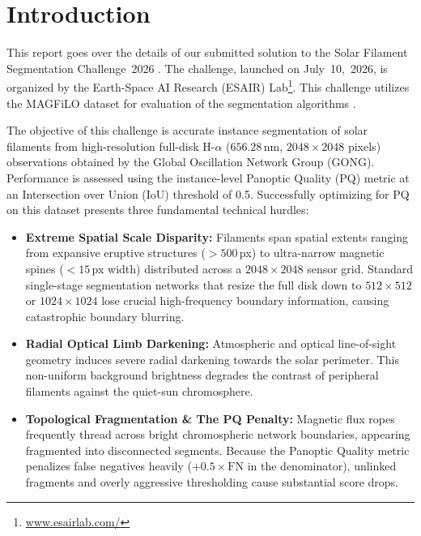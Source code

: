 \documentclass[sigconf]{acmart}
\begin{document}
\maketitle

\ifguideStyle
{}
\par\medskip
\fi

\section{Introduction}
    This report goes over the details of our submitted solution to the Solar Filament Segmentation Challenge~2026 \cite{filament-segmentation-2026}. The challenge, launched on July~10,~2026, is organized by the Earth-Space AI Research (ESAIR) Lab\footnote{\href{https://www.esairlab.com/home}{www.esairlab.com/}}. This challenge utilizes the MAGFiLO dataset for evaluation of the segmentation algorithms \cite{ahmadzadeh2024dataset}. 

    The objective of this challenge is accurate instance segmentation of solar filaments from high-resolution full-disk H-$\alpha$ ($656.28$\,nm, $2048\times2048$ pixels) observations obtained by the Global Oscillation Network Group (GONG). Performance is assessed using the instance-level Panoptic Quality (PQ) metric at an Intersection over Union (IoU) threshold of 0.5. Successfully optimizing for PQ on this dataset presents three fundamental technical hurdles:
    \begin{itemize}
        \item \textbf{Extreme Spatial Scale Disparity:} Filaments span spatial extents ranging from expansive eruptive structures ($>500$\,px) to ultra-narrow magnetic spines ($<15$\,px width) distributed across a $2048\times2048$ sensor grid. Standard single-stage segmentation networks that resize the full disk down to $512\times512$ or $1024\times1024$ lose crucial high-frequency boundary information, causing catastrophic boundary blurring.
        \item \textbf{Radial Optical Limb Darkening:} Atmospheric and optical line-of-sight geometry induces severe radial darkening towards the solar perimeter. This non-uniform background brightness degrades the contrast of peripheral filaments against the quiet-sun chromosphere.
        \item \textbf{Topological Fragmentation \& The PQ Penalty:} Magnetic flux ropes frequently thread across bright chromospheric network boundaries, appearing fragmented into disconnected segments. Because the Panoptic Quality metric penalizes false negatives heavily ($+0.5\times\text{FN}$ in the denominator), unlinked fragments and overly aggressive thresholding cause substantial score drops.
    \end{itemize}
\end{document}
